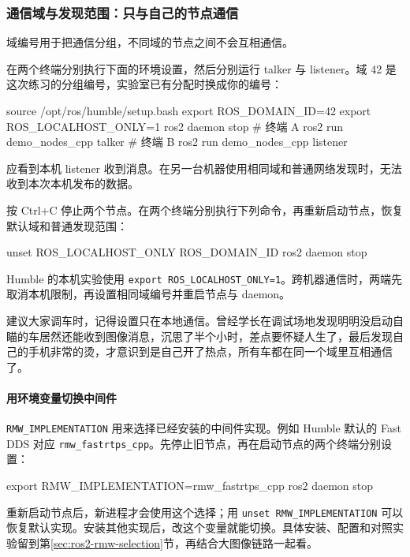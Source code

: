 \subsubsection{通信域与发现范围：只与自己的节点通信}
域编号用于把通信分组，不同域的节点之间不会互相通信。

\begin{example}[临时启用本机通信并恢复]
在两个终端分别执行下面的环境设置，然后分别运行 talker 与 listener。域 42 是这次练习的分组编号，实验室已有分配时换成你的编号：
\par\medskip\noindent\begin{minipage}{\linewidth}
\begin{tbash}
source /opt/ros/humble/setup.bash
export ROS_DOMAIN_ID=42
export ROS_LOCALHOST_ONLY=1
ros2 daemon stop
# 终端 A
ros2 run demo_nodes_cpp talker
# 终端 B
ros2 run demo_nodes_cpp listener
\end{tbash}
\end{minipage}\par\smallskip
应看到本机 listener 收到消息。在另一台机器使用相同域和普通网络发现时，无法收到本次本机发布的数据。

按 Ctrl+C 停止两个节点。在两个终端分别执行下列命令，再重新启动节点，恢复默认域和普通发现范围：
\par\medskip\noindent\begin{minipage}{\linewidth}
\begin{tbash}
unset ROS_LOCALHOST_ONLY ROS_DOMAIN_ID
ros2 daemon stop
\end{tbash}
\end{minipage}\par\smallskip
\end{example}

Humble 的本机实验使用 \texttt{export ROS\_LOCALHOST\_ONLY=1}。跨机器通信时，两端先取消本机限制，再设置相同域编号并重启节点与 daemon。

\begin{note}
建议大家调车时，记得设置只在本地通信。曾经学长在调试场地发现明明没启动自瞄的车居然还能收到图像消息，沉思了半个小时，差点要怀疑人生了，最后发现自己的手机非常的烫，才意识到是自己开了热点，所有车都在同一个域里互相通信了。
\end{note}

\paragraph*{用环境变量切换中间件}
\texttt{RMW\_IMPLEMENTATION} 用来选择已经安装的中间件实现。例如 Humble 默认的 Fast DDS 对应 \nolinkurl{rmw_fastrtps_cpp}。先停止旧节点，再在启动节点的两个终端分别设置：
\par\medskip\noindent\begin{minipage}{\linewidth}
\begin{tbash}
export RMW_IMPLEMENTATION=rmw_fastrtps_cpp
ros2 daemon stop
\end{tbash}
\end{minipage}\par\smallskip
重新启动节点后，新进程才会使用这个选择；用 \texttt{unset RMW\_IMPLEMENTATION} 可以恢复默认实现。安装其他实现后，改这个变量就能切换。具体安装、配置和对照实验留到第\ref{sec:ros2-rmw-selection}节，再结合大图像链路一起看。

